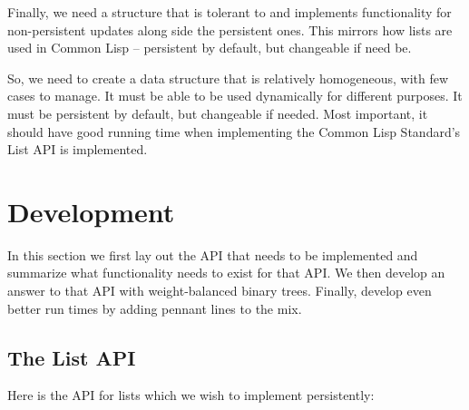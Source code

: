 \documentclass[sigconf]{acmart}
\begin{document}
Finally, we need a structure that is tolerant to and implements functionality
for non-persistent updates along side the persistent ones. This mirrors how
lists are used in Common Lisp -- persistent by default, but changeable if need
be.

So, we need to create a data structure that is relatively homogeneous, with
few cases to manage. It must be able to be used dynamically for different
purposes. It must be persistent by default, but changeable if needed. Most
important, it should have good running time when implementing the Common Lisp
Standard's List API is implemented.

\section{Development}

In this section we first lay out the API that needs to be implemented and summarize
what functionality needs to exist for that API. We then develop an answer to
that API with weight-balanced binary trees. Finally, develop even better run
times by adding pennant lines to the mix.

\subsection{The List API}

Here is the API for lists which we wish to implement persistently:
\end{document}
